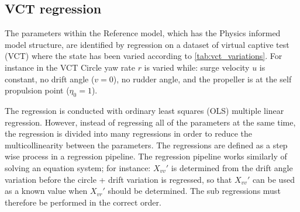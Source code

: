 \subsection{VCT regression}
\label{sec:VCT_regression}
The parameters within the Reference model, which has the Physics informed model structure, are identified by regression on a dataset of virtual captive test (VCT) where the state has been varied according to \autoref{tab:vct_variations}. For instance in the VCT Circle yaw rate $r$ is varied while: surge velocity $u$ is constant, no drift angle ($v=0$), no rudder angle, and the propeller is at the self propulsion point ($\eta_0=1$).

The regression is conducted with ordinary least squares (OLS) multiple linear regression. However, instead of regressing all of the parameters at the same time, the regression is divided into many regressions in order to reduce the multicollinearity between the parameters. The regressions are defined as a step wise process in a regression pipeline. 
The regression pipeline works similarly of solving an equation system; for instance: ${X_{vv}}'$ is determined from the drift angle variation before the circle + drift variation is regressed, so that ${X_{vv}}'$ can be used as a known value when ${X_{vr}}'$ should be determined. The sub regressions must therefore be performed in the correct order. 

